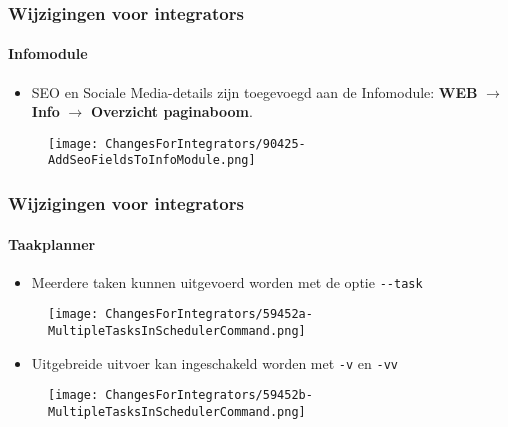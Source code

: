 
\begin{frame}[fragile]
	\frametitle{Wijzigingen voor integrators}
	\framesubtitle{Infomodule}

	\begin{itemize}
		\item SEO en Sociale Media-details zijn toegevoegd aan de Infomodule:\newline
			\textbf{WEB} $\rightarrow$ \textbf{Info} $\rightarrow$ \textbf{Overzicht paginaboom}.
	\end{itemize}

	\begin{figure}
		\texttt{[image: ChangesForIntegrators/90425-AddSeoFieldsToInfoModule.png]}
	\end{figure}

\end{frame}


\begin{frame}[fragile]
	\frametitle{Wijzigingen voor integrators}
	\framesubtitle{Taakplanner}

	\lstset{basicstyle=\tiny\ttfamily}

	\begin{itemize}
		\item Meerdere taken kunnen uitgevoerd worden met de optie \texttt{-}\texttt{-}\texttt{task}
	\end{itemize}

	\begin{figure}
		\texttt{[image: ChangesForIntegrators/59452a-MultipleTasksInSchedulerCommand.png]}
	\end{figure}

	\begin{itemize}
		\item Uitgebreide uitvoer kan ingeschakeld worden met \texttt{-}\texttt{v} en \texttt{-}\texttt{vv}
	\end{itemize}

	\begin{figure}
		\texttt{[image: ChangesForIntegrators/59452b-MultipleTasksInSchedulerCommand.png]}
	\end{figure}

\end{frame}

